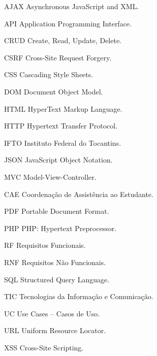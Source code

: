 \begin{siglas}
    \item[AJAX] Asynchronous JavaScript and XML.
    \item[API] Application Programming Interface.
    \item[CRUD] Create, Read, Update, Delete.
    \item[CSRF] Cross-Site Request Forgery.
    \item[CSS] Cascading Style Sheets.
    \item[DOM] Document Object Model.
    \item[HTML] HyperText Markup Language.
    \item[HTTP] Hypertext Transfer Protocol.
    \item[IFTO] Instituto Federal do Tocantins.
    \item[JSON] JavaScript Object Notation.
    \item[MVC] Model-View-Controller.
    \item[CAE] Coordenação de Assistência ao Estudante.
    \item[PDF] Portable Document Format.
    \item[PHP] PHP: Hypertext Preprocessor.
    \item[RF] Requisitos Funcionais.
    \item[RNF] Requisitos Não Funcionais.
    \item[SQL] Structured Query Language.
    \item[TIC] Tecnologias da Informação e Comunicação.
    \item[UC] Use Cases – Casos de Uso.
    \item[URL] Uniform Resource Locator.
    \item[XSS] Cross-Site Scripting.
\end{siglas}